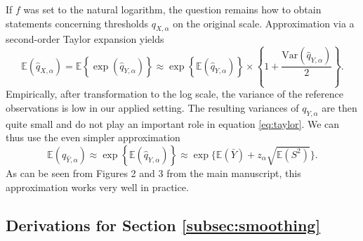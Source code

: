 \documentclass{article}
\begin{document}
If $f$ was set to the natural logarithm, the question remains how to obtain statements concerning thresholds $q_{X, \alpha}$ on the original scale. Approximation via a second-order Taylor expansion yields
\begin{equation}
\mathbb{E}(\hat{q}_{X, \alpha}) = \mathbb{E}\left\{\exp(\hat{q}_{Y, \alpha})\right\} \approx \exp\left\{\mathbb{E}(\hat{q}_{Y, \alpha})\right\} \times \left\{1 + \frac{\text{Var}(\hat{q}_{Y, \alpha})}{2} \right\}.
\label{eq:taylor}
\end{equation}
Empirically, after transformation to the log scale, the variance of the reference observations is low in our applied setting. The resulting variances of $q_{Y, \alpha}$ are then quite small and do not play an important role in equation \eqref{eq:taylor}. We can thus use the even simpler approximation
\begin{equation}
\mathbb{E}(q_{\hat{Y}, \alpha}) \approx \exp\left\{\mathbb{E}(\hat{q}_{Y, \alpha})\right\} \approx \exp\{\mathbb{E}(\bar{Y}) + z_\alpha \sqrt{\mathbb{E}(S^2)}\}.
\end{equation}
As can be seen from Figures 2 and 3 from the main manuscript, this approximation works very well in practice. %

\subsection{Derivations for Section \ref{subsec:smoothing}}
\end{document}
